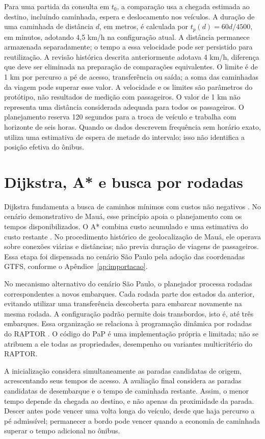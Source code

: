 \documentclass[12pt,oneside,a4paper,brazil,chapter=TITLE]{abntex2}
\let\papsection\section
\renewcommand{\section}{\clearpage\papsection}
\begin{document}
\begin{apendicesenv}
Para uma partida da consulta em $t_0$, a comparação usa a chegada estimada ao destino, incluindo caminhada, espera e deslocamento nos veículos. A duração de uma caminhada de distância $d$, em metros, é calculada por $t_p(d)=60d/4500$, em minutos, adotando 4,5 km/h na configuração atual. A distância permanece armazenada separadamente; o tempo a essa velocidade pode ser persistido para reutilização. A revisão histórica descrita anteriormente adotava 4 km/h, diferença que deve ser eliminada na preparação de comparações equivalentes. O limite é de 1 km por percurso a pé de acesso, transferência ou saída; a soma das caminhadas da viagem pode superar esse valor. A velocidade e os limites são parâmetros do protótipo, não resultados de medição com passageiros. O valor de 1 km não representa uma distância considerada adequada para todos os passageiros. O planejamento reserva 120 segundos para a troca de veículo e trabalha com horizonte de seis horas. Quando os dados descrevem frequência sem horário exato, utiliza uma estimativa de espera de metade do intervalo; isso não identifica a posição efetiva do ônibus.

\section{Dijkstra, A* e busca por rodadas}
Dijkstra fundamenta a busca de caminhos mínimos com custos não negativos \citep{dijkstra1959}. No cenário demonstrativo de Mauá, esse princípio apoia o planejamento com os tempos disponibilizados. O A* combina custo acumulado e uma estimativa do custo restante \citep{hart1968}. No procedimento histórico de geolocalização de Mauá, ele operava sobre conexões viárias e distâncias; não previa duração de viagens de passageiros. Essa etapa foi dispensada no cenário São Paulo pela adoção das coordenadas GTFS, conforme o Apêndice~\ref{ap:importacao}.

No mecanismo alternativo do cenário São Paulo, o planejador processa rodadas correspondentes a novos embarques. Cada rodada parte dos estados da anterior, evitando utilizar uma transferência descoberta para embarcar novamente na mesma rodada. A configuração padrão permite dois transbordos, isto é, até três embarques. Essa organização se relaciona à programação dinâmica por rodadas do RAPTOR \citep{delling2012}. O código do PaP é uma implementação própria e limitada; não se atribuem a ele todas as propriedades, desempenho ou variantes multicritério do RAPTOR.

A inicialização considera simultaneamente as paradas candidatas de origem, acrescentando seus tempos de acesso. A avaliação final considera as paradas candidatas de desembarque e o tempo de caminhada restante. Assim, o menor tempo depende da chegada ao destino, e não apenas da proximidade da parada. Descer antes pode vencer uma volta longa do veículo, desde que haja percurso a pé admissível; permanecer a bordo pode vencer quando a economia de caminhada superar o tempo adicional no ônibus.


\end{apendicesenv}
\end{document}
